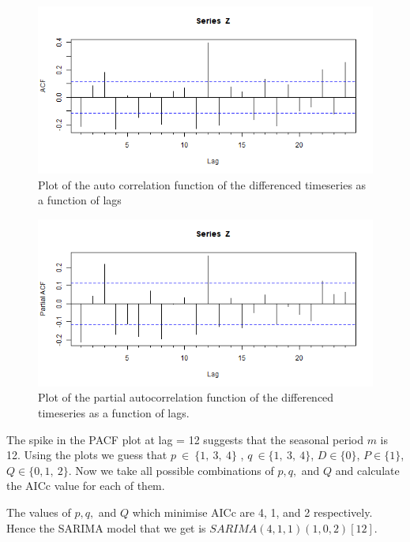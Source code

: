 \documentclass[
]{article}
\begin{document}
\begin{figure}
\centering
\includegraphics{Plots/acfZ.png}
\caption{Plot of the auto correlation function of the differenced
timeseries as a function of lags}
\end{figure}

\begin{figure}
\centering
\includegraphics{Plots/pacfZ.png}
\caption{Plot of the partial autocorrelation function of the differenced
timeseries as a function of lags.}
\end{figure}

The spike in the PACF plot at lag = 12 suggests that the seasonal period
\(m\) is 12. Using the plots we guess that \(p\  \in \ \{ 1,\ 3,\ 4\}\)
, \(q\  \in \{ 1,\ 3,\ 4\}\), \(D \in \{ 0\}\), \(P \in \{ 1\}\),
\(Q \in \{ 0,1,\ 2\}\). Now we take all possible combinations of
\(p, q,\) and \(Q\) and calculate the AICc value for each of them.

The values of \(p, q,\) and \(Q\) which minimise AICc are 4, 1, and 2
respectively. Hence the SARIMA model that we get is
\(SARIMA(4,1,1)(1,0,2)[12]\).
\end{document}
